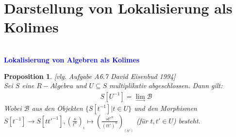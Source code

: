 \documentclass[10pt,a4paper]{report}
\newcommand{\ModulsOfDifferenzials}{David Eisenbud 1994}
\newcounter{Aussage}[chapter]
\newtheorem{prop}[Aussage]{Proposition}
\newcommand{\lok}[2]{#1 [#2^{-1}]}
\newcommand{\loke}[3]{(\frac{#1}{#2})_{_{#3}}}
\newcommand{\colimes}[0]{\lim\limits_{ \longrightarrow }}
\begin{document}
\section{Darstellung von Lokalisierung als Kolimes}
\ \\
\textcolor{blue}{\textbf{Lokalisierung von Algebren als Kolimes}}
\begin{prop}\label{Lokalisierung von Algebren als Kolimes} \textit{[vlg. Aufgabe A6.7 \ModulsOfDifferenzials]} \\
Sei $S$ eine $R-Algebra$ und $U \subseteq S$ multiplikativ abgeschlossen.
Dann gilt:
\begin{gather*}
 S[U^{-1}] = \colimes \mathcal{B}
\end{gather*}
Wobei $\mathcal{B}$ aus den Objekten $\lbrace \lok{S}{t} \vert t \in U \rbrace$ und den Morphismen\\
$\lok{S}{t} \longrightarrow \lok{S}{tt'}, \loke{s}{t^n}{t} \longmapsto \loke{st'^n}{(tt')^n}{(tt')}$ (für $t,t' \in U$) besteht.\\
\end{prop}
\end{document}
